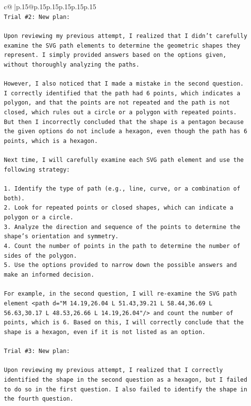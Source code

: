 \documentclass{article}
\begin{document}
{\begin{supertabular}{c@{$\;$}|p{.15\linewidth}@{}p{.15\linewidth}p{.15\linewidth}p{.15\linewidth}p{.15\linewidth}p{.15\linewidth}}
{{{\\ 
\texttt{Trial \#2: New plan: } \\
\\ 
\texttt{Upon reviewing my previous attempt, I realized that I didn't carefully examine the SVG path elements to determine the geometric shapes they represent. I simply provided answers based on the options given, without thoroughly analyzing the paths.} \\
\\ 
\texttt{However, I also noticed that I made a mistake in the second question. I correctly identified that the path had 6 points, which indicates a polygon, and that the points are not repeated and the path is not closed, which rules out a circle or a polygon with repeated points. But then I incorrectly concluded that the shape is a pentagon because the given options do not include a hexagon, even though the path has 6 points, which is a hexagon.} \\
\\ 
\texttt{Next time, I will carefully examine each SVG path element and use the following strategy:} \\
\\ 
\texttt{1. Identify the type of path (e.g., line, curve, or a combination of both).} \\
\texttt{2. Look for repeated points or closed shapes, which can indicate a polygon or a circle.} \\
\texttt{3. Analyze the direction and sequence of the points to determine the shape's orientation and symmetry.} \\
\texttt{4. Count the number of points in the path to determine the number of sides of the polygon.} \\
\texttt{5. Use the options provided to narrow down the possible answers and make an informed decision.} \\
\\ 
\texttt{For example, in the second question, I will re{-}examine the SVG path element <path d="M 14.19,26.04 L 51.43,39.21 L 58.44,36.69 L 56.63,30.17 L 48.53,26.66 L 14.19,26.04"/> and count the number of points, which is 6. Based on this, I will correctly conclude that the shape is a hexagon, even if it is not listed as an option.} \\
\\ 
\texttt{Trial \#3: New plan: } \\
\\ 
\texttt{Upon reviewing my previous attempt, I realized that I correctly identified the shape in the second question as a hexagon, but I failed to do so in the first question. I also failed to identify the shape in the fourth question.} \\
}}}
\end{supertabular}}
\end{document}
